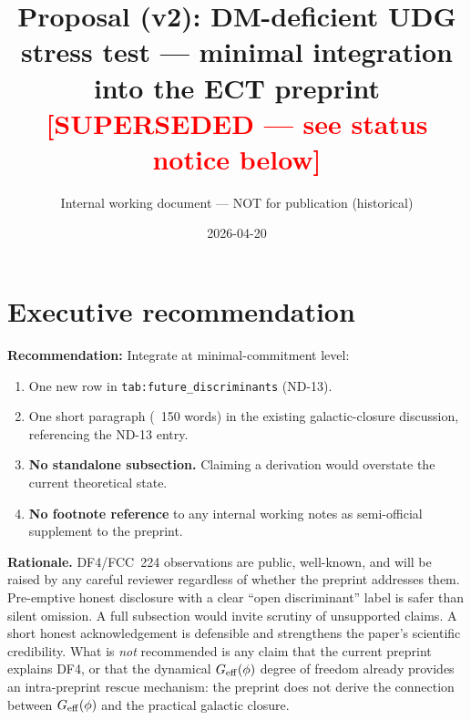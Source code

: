 \documentclass[11pt]{article}
\title{Proposal (v2): DM-deficient UDG stress test --- minimal integration\\
into the ECT preprint\\
\large\textcolor{red}{[SUPERSEDED --- see status notice below]}}
\author{Internal working document --- NOT for publication (historical)}
\date{2026-04-20}
\begin{document}
\maketitle

\begin{center}
\end{center}

\vspace{0.5em}

\section*{Executive recommendation}

\textbf{Recommendation:} Integrate at minimal-commitment level:
\begin{enumerate}
\item One new row in {\tt tab:future\_discriminants} (ND-13).
\item One short paragraph (~150 words) in the existing galactic-closure
discussion, referencing the ND-13 entry.
\item \textbf{No standalone subsection.} Claiming a derivation would
overstate the current theoretical state.
\item \textbf{No footnote reference} to any internal working notes as
semi-official supplement to the preprint.
\end{enumerate}

\textbf{Rationale.} DF4/FCC~224 observations are public, well-known,
and will be raised by any careful reviewer regardless of whether the
preprint addresses them. Pre-emptive honest disclosure with a clear
``open discriminant'' label is safer than silent omission. A full
subsection would invite scrutiny of unsupported claims. A short honest
acknowledgement is defensible and strengthens the paper's scientific
credibility. What is \emph{not} recommended is any claim that the
current preprint explains DF4, or that the dynamical $G_{\rm eff}(\phi)$
degree of freedom already provides an intra-preprint rescue mechanism:
the preprint does not derive the connection between $G_{\rm eff}(\phi)$
and the practical galactic closure.
\end{document}
